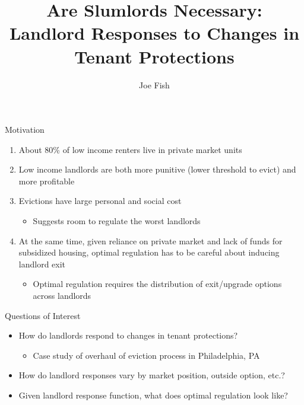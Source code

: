 \documentclass[10pt, xcolor=dvipsnames]{beamer}
\date{}
\title[Landlord Responses to Changes in Tenant Protections]{Are Slumlords Necessary: \\Landlord Responses to Changes in Tenant Protections} %
\author[Joe Fish]{Joe Fish}
\begin{document}
\begin{frame}
\titlepage %
\end{frame}

\begin{frame}{Motivation}
    \begin{enumerate}
        \item About 80\% of low income renters live in private market units \parencite{jchs_2024, nhpd2024profiles}
        \pause
        \item Low income landlords are both more punitive (lower threshold to evict) and more profitable \parencite{Desmond_2019, Eisfeldt_2015,Damen_2025}
        \item Evictions have large personal and social cost \parencite{desmond-evicted,humphries2025, collison-et-al-2023}
        \begin{itemize}
            \item Suggests room to regulate the worst landlords
        \end{itemize}
        \pause
        \item At the same time, given reliance on private market and lack of funds for subsidized housing, optimal regulation has to be careful about inducing landlord exit
        \begin{itemize}
            \item Optimal regulation requires the distribution of exit/upgrade options across landlords
        \end{itemize}
    \end{enumerate}

\end{frame}


\begin{frame}{Questions of Interest}
    \begin{itemize}
        \item How do landlords respond to changes in tenant protections?
        \begin{itemize}
           \item Case study of overhaul of eviction process in Philadelphia, PA
        \end{itemize}
         \item How do landlord responses vary by market position, outside option, etc.?
         \item Given landlord response function, what does optimal regulation look like?
    \end{itemize}
\end{frame}
\end{document}
